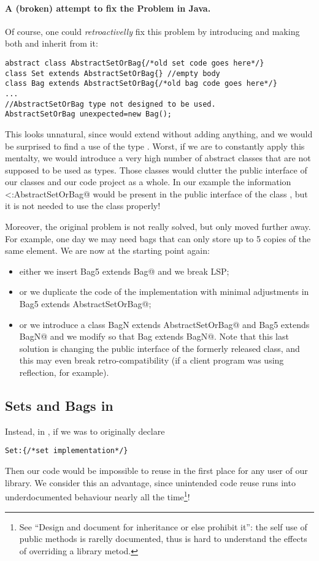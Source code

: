 \paragraph{A (broken) attempt to fix the Problem in Java.}
Of course, one could \emph{retroactivelly} fix this problem by introducing \Q@AbstractSetOrBag@
and making both \Q@Bag@ and \Q@Set@ inherit from it:
\begin{lstlisting}
abstract class AbstractSetOrBag{/*old set code goes here*/}
class Set extends AbstractSetOrBag{} //empty body
class Bag extends AbstractSetOrBag{/*old bag code goes here*/}
...
//AbstractSetOrBag type not designed to be used.
AbstractSetOrBag unexpected=new Bag(); 
\end{lstlisting}

This looks unnatural, since \Q@Set@ would extend \Q@AbstractSetOrBag@ without adding anything,
and we would be surprised to find a use of the type \Q@AbstractSetOrBag@.
Worst, if we are to constantly apply this mentalty, we would introduce a very high number
of abstract classes that are not supposed to be used as types. Those classes would clutter the 
public interface of our classes and our code project as a whole.
In our example the information \Q@Set<:AbstractSetOrBag@ would be present in the public interface
of the class \Q@Set@, but it is not needed to use the class properly!

Moreover, the original problem is not really solved, but only moved 
further away. For example, one day  we may need bags that can only store up to 5 copies of the same element.
We are now at the starting point again:
\begin{itemize}
\item either we insert \Q@class Bag5 extends Bag@ and we break LSP; 
\item or we duplicate the code of the \Q@Bag@ implementation with minimal
  adjustments in \Q@class Bag5 extends AbstractSetOrBag@;
\item or we introduce a
\Q@abstract class BagN extends AbstractSetOrBag@ and \Q@class Bag5 extends BagN@
and we modify \Q@Bag@ so that  \Q@class Bag extends BagN@.
Note that this last solution is changing the public interface of the formerly released \Q@Bag@ class, and
this may even break retro-compatibility (if a client program was using
reflection, for example).
\end{itemize}

\subsection{Sets and Bags in \name}
Instead, in \name, if we was to originally declare
\begin{lstlisting}
Set:{/*set implementation*/} 
\end{lstlisting}
Then our code would be impossible to reuse in the first place for any user of our library.
We consider this an advantage, since unintended code reuse runs into underdocumented behaviour nearly all the time\footnote{See
``Design and document for inheritance or else prohibit
it''\cite{Bloch08}: the
self use of public methods is rarelly documented, thus is hard to understand the effects of overriding a library metod.
}!


